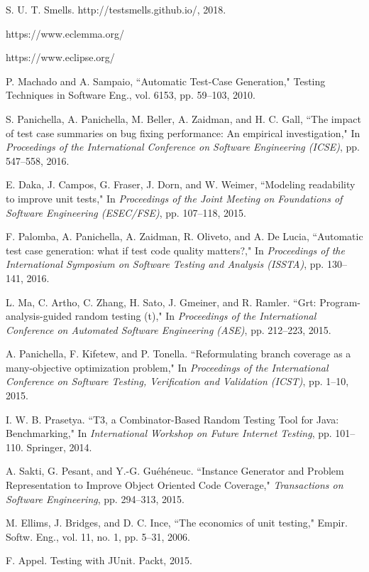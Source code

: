 \documentclass[conference]{IEEEtran}
\begin{document}
\begin{thebibliography}{15}
 S. U. T. Smells. http://testsmells.github.io/, 2018.

 https://www.eclemma.org/

 https://www.eclipse.org/

 P. Machado and A. Sampaio, ``Automatic Test-Case Generation," Testing Techniques in Software Eng., vol. 6153, pp. 59--103, 2010. 

 S. Panichella, A. Panichella, M. Beller, A. Zaidman, and H. C. Gall, ``The impact of test case summaries on bug fixing performance: An empirical investigation," In {\it Proceedings of the International Conference on Software Engineering (ICSE)}, pp. 547--558, 2016.

 E. Daka, J. Campos, G. Fraser, J. Dorn, and W. Weimer, ``Modeling readability to improve unit tests," In {\it Proceedings of the Joint Meeting on Foundations of Software Engineering (ESEC/FSE)}, pp. 107--118, 2015.

 F. Palomba, A. Panichella, A. Zaidman, R. Oliveto, and A. De Lucia, ``Automatic test case generation: what if test code quality matters?," In {\it Proceedings of the International Symposium on Software Testing and Analysis (ISSTA)}, pp. 130--141, 2016.

 L. Ma, C. Artho, C. Zhang, H. Sato, J. Gmeiner, and R. Ramler. ``Grt: Program-analysis-guided random testing (t)," In {\it Proceedings of the International Conference on Automated Software Engineering (ASE)}, pp. 212--223, 2015.

 A. Panichella, F. Kifetew, and P. Tonella. ``Reformulating branch coverage as a many-objective optimization problem," In {\it Proceedings of the International Conference on Software Testing, Verification and Validation (ICST)}, pp. 1--10, 2015. 

 I. W. B. Prasetya. ``T3, a Combinator-Based Random Testing Tool for Java: Benchmarking," In {\it International Workshop on Future Internet Testing}, pp. 101--110. Springer, 2014.

 A. Sakti, G. Pesant, and Y.-G. Gu\'{e}h\'{e}neuc. ``Instance Generator and Problem Representation to Improve Object Oriented Code Coverage," {\it Transactions on Software Engineering}, pp. 294--313, 2015.

 M. Ellims, J. Bridges, and D. C. Ince, ``The economics of unit testing," Empir. Softw. Eng., vol. 11, no. 1, pp. 5--31, 2006.

 F. Appel. Testing with JUnit. Packt, 2015.

\end{thebibliography}

\end{document}
